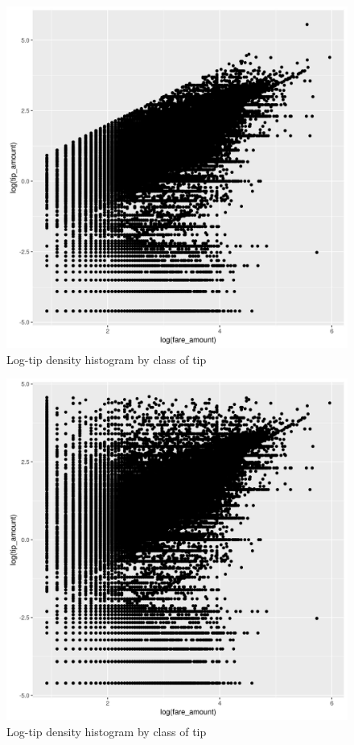\documentclass[11pt]{article}
\begin{document}
\begin{figure}[htbp]
\centering
\includegraphics[width=.9\linewidth]{./plots/logFareTipStandardPlot.jpg}
\caption{\label{fig:org8b1c348}
Log-tip density histogram by class of tip}
\end{figure}

\begin{figure}[htbp]
\centering
\includegraphics[width=.9\linewidth]{./plots/logFareTip100Plot.jpg}
\caption{\label{fig:org161d101}
Log-tip density histogram by class of tip}
\end{figure}
\end{document}
